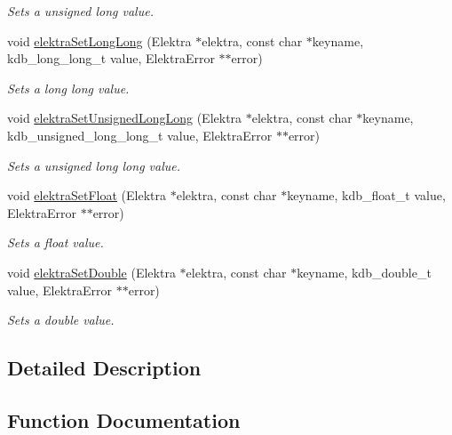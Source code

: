 \begin{DoxyCompactItemize}
\begin{DoxyCompactList}\small\item\em Sets a unsigned long value. \end{DoxyCompactList}\item 
void \hyperlink{group__highlevel_gaa91c0a9b907afdb1f8b202804be36f6f}{elektra\+Set\+Long\+Long} (Elektra $\ast$elektra, const char $\ast$keyname, kdb\+\_\+long\+\_\+long\+\_\+t value, Elektra\+Error $\ast$$\ast$error)
\begin{DoxyCompactList}\small\item\em Sets a long long value. \end{DoxyCompactList}\item 
void \hyperlink{group__highlevel_ga4aba418539ac27449193b8f8cb761734}{elektra\+Set\+Unsigned\+Long\+Long} (Elektra $\ast$elektra, const char $\ast$keyname, kdb\+\_\+unsigned\+\_\+long\+\_\+long\+\_\+t value, Elektra\+Error $\ast$$\ast$error)
\begin{DoxyCompactList}\small\item\em Sets a unsigned long long value. \end{DoxyCompactList}\item 
void \hyperlink{group__highlevel_gae9f490191adb55639c70501e1ca3fbe8}{elektra\+Set\+Float} (Elektra $\ast$elektra, const char $\ast$keyname, kdb\+\_\+float\+\_\+t value, Elektra\+Error $\ast$$\ast$error)
\begin{DoxyCompactList}\small\item\em Sets a float value. \end{DoxyCompactList}\item 
void \hyperlink{group__highlevel_ga803c1b5131516de24bc81c94aca44bbd}{elektra\+Set\+Double} (Elektra $\ast$elektra, const char $\ast$keyname, kdb\+\_\+double\+\_\+t value, Elektra\+Error $\ast$$\ast$error)
\begin{DoxyCompactList}\small\item\em Sets a double value. \end{DoxyCompactList}\end{DoxyCompactItemize}


\subsection{Detailed Description}


\subsection{Function Documentation}
\mbox{\label{group__highlevel_gaf0413286c6faebdc951b739924111909}} 
